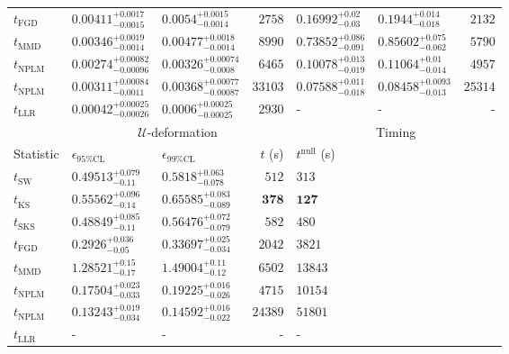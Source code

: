 \begin{tabular}{l|llr|llr}
	$t_{\mathrm{FGD}}$ & $0.00411_{-0.0015}^{+0.0017}$ & $0.0054_{-0.0014}^{+0.0015}$ & $2758$ & ${\mathbf{0.16992_{-0.03}^{+0.02}}}$ & ${\mathbf{0.1944_{-0.018}^{+0.014}}}$ & $2132$ \\
	$t_{\mathrm{MMD}}$ & ${\mathbf{0.00346_{-0.0014}^{+0.0019}}}$ & ${\mathbf{0.00477_{-0.0014}^{+0.0018}}}$ & $8990$ & $0.73852_{-0.091}^{+0.086}$ & $0.85602_{-0.062}^{+0.075}$ & $5790$ \\
\rowcolor{red!35}	$t_{\mathrm{NPLM}}$ & $0.00274_{-0.00096}^{+0.00082}$ & $0.00326_{-0.0008}^{+0.00074}$ & $6465$ & $0.10078_{-0.019}^{+0.013}$ & $0.11064_{-0.014}^{+0.01}$ & $4957$ \\
\rowcolor{blue!35}	$t_{\mathrm{NPLM}}$ & $0.00311_{-0.0011}^{+0.00084}$ & $0.00368_{-0.00087}^{+0.00077}$ & $33103$ & $0.07588_{-0.018}^{+0.011}$ & $0.08458_{-0.013}^{+0.0093}$ & $25314$ \\
	$t_{\mathrm{LLR}}$ & $0.00042_{-0.00026}^{+0.00025}$ & $0.0006_{-0.00025}^{+0.00025}$ & $2930$ & - & - & - \\
	\toprule
	\multicolumn{1}{c}{} & \multicolumn{3}{c}{$\mathcal{U}$-deformation} & \multicolumn{3}{c}{Timing} \\
	Statistic & $\epsilon_{95\%\mathrm{CL}}$ & $\epsilon_{99\%\mathrm{CL}}$ & $t$ (s) & $t^{\mathrm{null}}$ (s) \\
	\midrule
	$t_{\mathrm{SW}}$ & $0.49513_{-0.11}^{+0.079}$ & $0.5818_{-0.078}^{+0.063}$ & $512$ & $313$ \\
	$t_{\overline{\mathrm{KS}}}$ & $0.55562_{-0.14}^{+0.096}$ & $0.65585_{-0.089}^{+0.083}$ & ${\mathbf{378}}$ & ${\mathbf{127}}$ \\
	$t_{\mathrm{SKS}}$ & $0.48849_{-0.11}^{+0.085}$ & $0.56476_{-0.079}^{+0.072}$ & $582$ & $480$ \\
	$t_{\mathrm{FGD}}$ & ${\mathbf{0.2926_{-0.05}^{+0.036}}}$ & ${\mathbf{0.33697_{-0.034}^{+0.025}}}$ & $2042$ & $3821$ \\
	$t_{\mathrm{MMD}}$ & $1.28521_{-0.17}^{+0.15}$ & $1.49004_{-0.12}^{+0.11}$ & $6502$ & $13843$ \\
\rowcolor{red!35}	$t_{\mathrm{NPLM}}$ & $0.17504_{-0.033}^{+0.023}$ & $0.19225_{-0.026}^{+0.016}$ & $4715$ & $10154$ \\
\rowcolor{blue!35}	$t_{\mathrm{NPLM}}$ & $0.13243_{-0.034}^{+0.019}$ & $0.14592_{-0.022}^{+0.016}$ & $24389$ & $51801$ \\
	$t_{\mathrm{LLR}}$ & - & - & - & - \\
	\bottomrule
\end{tabular}